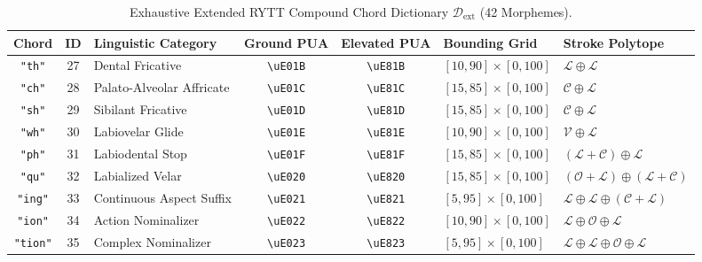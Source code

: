 \documentclass[11pt,oneside,letterpaper]{article}
\theoremstyle{sovereignstyle}
\begin{document}
\begin{table}[b]
\centering
\footnotesize
\caption{Exhaustive Extended RYTT Compound Chord Dictionary $\mathcal{D}_{\text{ext}}$ (42 Morphemes).}
\label{tab:extended_chords}
\begin{tabularx}{\textwidth}{cc>{\raggedright\arraybackslash}Xcc>{\raggedright\arraybackslash}p{3.2cm}>{\raggedright\arraybackslash}X}
\toprule
\textbf{Chord} & \textbf{ID} & \textbf{Linguistic Category} & \textbf{Ground PUA} & \textbf{Elevated PUA} & \textbf{Bounding Grid} & \textbf{Stroke Polytope} \\
\midrule
\texttt{"th"}   & 27 & Dental Fricative           & \texttt{\textbackslash uE01B} & \texttt{\textbackslash uE81B} & $[10, 90] \times [0, 100]$ & $\mathcal{L} \oplus \mathcal{L}$ \\
\texttt{"ch"}   & 28 & Palato-Alveolar Affricate  & \texttt{\textbackslash uE01C} & \texttt{\textbackslash uE81C} & $[15, 85] \times [0, 100]$ & $\mathcal{C} \oplus \mathcal{L}$ \\
\texttt{"sh"}   & 29 & Sibilant Fricative         & \texttt{\textbackslash uE01D} & \texttt{\textbackslash uE81D} & $[15, 85] \times [0, 100]$ & $\mathcal{C} \oplus \mathcal{L}$ \\
\texttt{"wh"}   & 30 & Labiovelar Glide           & \texttt{\textbackslash uE01E} & \texttt{\textbackslash uE81E} & $[10, 90] \times [0, 100]$ & $\mathcal{V} \oplus \mathcal{L}$ \\
\texttt{"ph"}   & 31 & Labiodental Stop           & \texttt{\textbackslash uE01F} & \texttt{\textbackslash uE81F} & $[15, 85] \times [0, 100]$ & $(\mathcal{L}+\mathcal{C}) \oplus \mathcal{L}$ \\
\texttt{"qu"}   & 32 & Labialized Velar           & \texttt{\textbackslash uE020} & \texttt{\textbackslash uE820} & $[15, 85] \times [0, 100]$ & $(\mathcal{O}+\mathcal{L}) \oplus (\mathcal{L}+\mathcal{C})$ \\
\texttt{"ing"}  & 33 & Continuous Aspect Suffix   & \texttt{\textbackslash uE021} & \texttt{\textbackslash uE821} & $[5, 95] \times [0, 100]$  & $\mathcal{L} \oplus \mathcal{L} \oplus (\mathcal{C}+\mathcal{L})$ \\
\texttt{"ion"}  & 34 & Action Nominalizer         & \texttt{\textbackslash uE022} & \texttt{\textbackslash uE822} & $[10, 90] \times [0, 100]$ & $\mathcal{L} \oplus \mathcal{O} \oplus \mathcal{L}$ \\
\texttt{"tion"} & 35 & Complex Nominalizer        & \texttt{\textbackslash uE023} & \texttt{\textbackslash uE823} & $[5, 95] \times [0, 100]$  & $\mathcal{L} \oplus \mathcal{L} \oplus \mathcal{O} \oplus \mathcal{L}$ \\

\end{tabularx}
\end{table}
\end{document}
